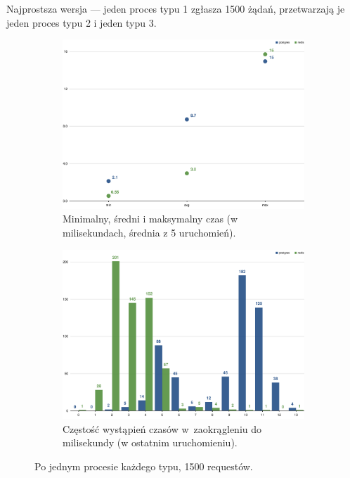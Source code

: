 \documentclass[a4paper,11pt]{article}
\begin{document}
Najprostsza wersja --- jeden proces typu 1 zgłasza 1500 żądań, przetwarzają je jeden proces typu 2 i jeden typu 3.
\begin{figure}[h!]
  \centering
  \begin{subfigure}{\textwidth}
    \centering
    \includegraphics[width=\textwidth]{charts/1-1-1-min-avg-max}
    \caption{Minimalny, średni i maksymalny czas (w milisekundach, średnia z 5 uruchomień).}
  \end{subfigure}
  \begin{subfigure}{\textwidth}
    \centering
    \includegraphics[width=\textwidth]{charts/1-1-1-grouped}
    \caption{Częstość wystąpień czasów w~zaokrągleniu do milisekundy (w ostatnim uruchomieniu).}
  \end{subfigure}
  \caption{Po jednym procesie każdego typu, 1500 requestów.}
  \label{1-1-1}
\end{figure}
\end{document}

